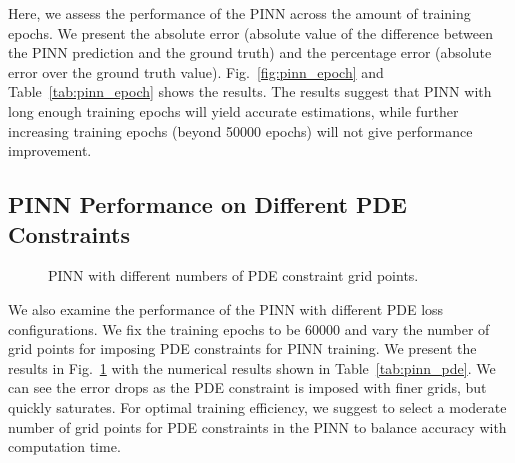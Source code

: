 \documentclass[letterpaper]{article} %
\newcommand{\todo}[1]{\textcolor{blue}{[TODO: #1]}}
\newcommand{\jacob}[1]{\textcolor{blue}{[Jacob: #1]}}
\begin{document}
Here, we assess the performance of the PINN across the amount of training epochs. We present the absolute error (absolute value of the difference between the PINN prediction and the ground truth) and the percentage error (absolute error over the ground truth value). Fig.~\ref{fig:pinn_epoch} and Table~\ref{tab:pinn_epoch} shows the results. 
The results suggest that PINN with long enough training epochs will yield accurate estimations, while further increasing training epochs (beyond  50000 epochs) will not give performance improvement.





\subsection{PINN Performance on Different PDE Constraints}

\begin{figure}[ht]
    \centering
    
    \caption{PINN with different numbers of PDE constraint grid points.}
    \label{fig:pinn_pde}
\end{figure}






We also examine the performance of the PINN with different PDE loss configurations. We fix the training epochs to be 60000 and vary the number of grid points for imposing PDE constraints for PINN training. We present the results in Fig.~\ref{fig:pinn_pde} with the numerical results shown in Table~\ref{tab:pinn_pde}. 
We can see the error drops as the PDE constraint is imposed with finer grids, but quickly saturates. For optimal training efficiency, we suggest to select a moderate number of grid points for PDE constraints in the PINN to balance accuracy with computation time. 
\end{document}
